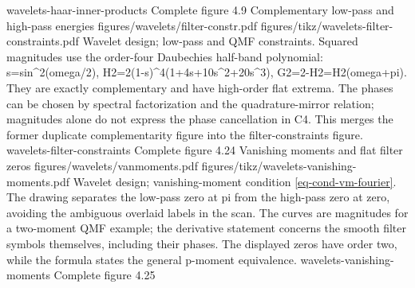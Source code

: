{wavelets-haar-inner-products}
{Complete figure}
{4.9}
{Complementary low-pass and high-pass energies}
{figures/wavelets/filter-constr.pdf}
{figures/tikz/wavelets-filter-constraints.pdf}
{Wavelet design; low-pass and QMF constraints.}
{Squared magnitudes use the order-four Daubechies half-band polynomial: s=sin\textasciicircum{}2(omega/2), H2=2(1-s)\textasciicircum{}4(1+4s+10s\textasciicircum{}2+20s\textasciicircum{}3), G2=2-H2=H2(omega+pi). They are exactly complementary and have high-order flat extrema. The phases can be chosen by spectral factorization and the quadrature-mirror relation; magnitudes alone do not express the phase cancellation in C4. This merges the former duplicate complementarity figure into the filter-constraints figure.}
{wavelets-filter-constraints}
{Complete figure}
{4.24}
{Vanishing moments and flat filter zeros}
{figures/wavelets/vanmoments.pdf}
{figures/tikz/wavelets-vanishing-moments.pdf}
{Wavelet design; vanishing-moment condition \eqref{eq-cond-vm-fourier}.}
{The drawing separates the low-pass zero at pi from the high-pass zero at zero, avoiding the ambiguous overlaid labels in the scan. The curves are magnitudes for a two-moment QMF example; the derivative statement concerns the smooth filter symbols themselves, including their phases. The displayed zeros have order two, while the formula states the general p-moment equivalence.}
{wavelets-vanishing-moments}
{Complete figure}
{4.25}

